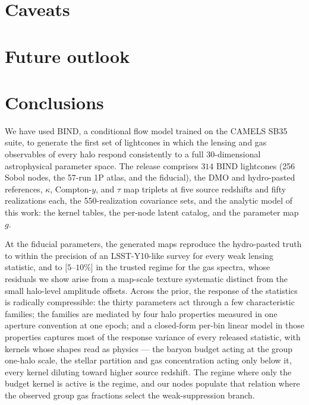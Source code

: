 \documentclass[linenumbers,trackchanges, twocolumn]{aastex701}
\begin{document}
\section{Caveats}\label{sec:caveats}
 
\section{Future outlook}\label{sec:outlook}
 
\section{Conclusions}\label{sec:conclusions}
We have used BIND, a conditional flow model trained on the CAMELS SB35 suite, to generate the first set of lightcones in which the lensing and gas observables of every halo respond consistently to a full 30-dimensional astrophysical parameter space. The release comprises $314$ BIND lightcones (256 Sobol nodes, the 57-run 1P atlas, and the fiducial), the DMO and hydro-pasted references, $\kappa$, Compton-$y$, and $\tau$ map triplets at five source redshifts and fifty realizations each, the 550-realization covariance sets, and the analytic model of this work: the kernel tables, the per-node latent catalog, and the parameter map $g$.
 
At the fiducial parameters, the generated maps reproduce the hydro-pasted truth to within the precision of an LSST-Y10-like survey for every weak lensing statistic, and to $[5$--$10\%]$ in the trusted regime for the gas spectra, whose residuals we show arise from a map-scale texture systematic distinct from the small halo-level amplitude offsets. Across the prior, the response of the statistics is radically compressible: the thirty parameters act through a few characteristic families; the families are mediated by four halo properties measured in one aperture convention at one epoch; and a closed-form per-bin linear model in those properties captures most of the response variance of every released statistic, with kernels whose shapes read as physics --- the baryon budget acting at the group one-halo scale, the stellar partition and gas concentration acting only below it, every kernel diluting toward higher source redshift. The regime where only the budget kernel is active is the \citet{vanDaalen-2020} regime, and our nodes populate that relation where the observed group gas fractions select the weak-suppression branch.
 
\end{document}
